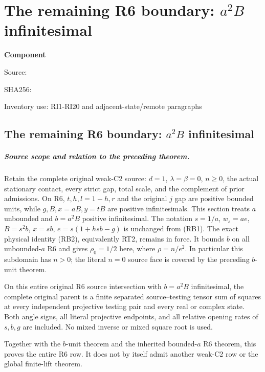 \chapter{The remaining R6 boundary: $a^2B$ infinitesimal}
\label{component:p75b395956985}
\noindent\textbf{Component }\par
{\small\noindent Source: \par}
{\small\noindent SHA256: \par}
{\small\noindent Inventory use: RI1-RI20 and adjacent-state/remote paragraphs\par}
\medskip
\section{The remaining R6 boundary: $a^2B$ infinitesimal}
\label{p75b395956985:sec:r6-b-inf}

\paragraph{Source scope and relation to the preceding theorem.}
Retain the complete original weak-C2 source: $d=1$, $\lambda=\beta=0$,
$n\geq0$, the actual stationary contact, every strict gap, total scale,
and the complement of prior admissions. On R6, $t,h,l=1-h,r$ and
the original $j$ gap are positive bounded units, while $g,B,x=aB,y=tB$
are positive infinitesimals. This section treats $a$ unbounded and
$b=a^2B$ positive infinitesimal. The notation $s=1/a$, $w_s=ae$,
$B=s^2b$, $x=sb$, $e=s(1+hsb-g)$ is unchanged from (RB1).
The exact physical identity (RB2), equivalently RT2, remains in force.
It bounds $b$ on all unbounded-$a$ R6 and gives $\rho_0=1/2$ here,
where $\rho=n/e^2$. In particular this subdomain has $n>0$; the
literal $n=0$ source face is covered by the preceding $b$-unit theorem.

\begin{theorem}
On this entire original R6 source intersection with $b=a^2B$
infinitesimal, the complete original parent is a finite separated
source--testing tensor sum of squares at every independent projective
testing pair and every real or complex state. Both angle signs, all
literal projective endpoints, and all relative opening rates of
$s,b,g$ are included. No mixed inverse or mixed square root is used.
\end{theorem}

Together with the $b$-unit theorem and the inherited bounded-$a$
R6 theorem, this proves the entire R6 row. It does not by itself
admit another weak-C2 row or the global finite-lift theorem.

